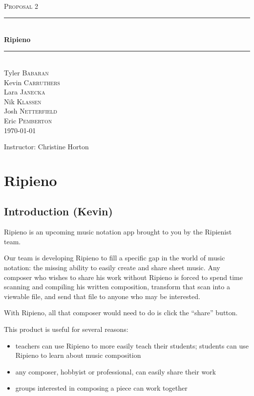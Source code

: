 \documentclass[12pt]{article}
\newcommand{\HRule}{\rule{\linewidth}{0.5mm}}
\begin{document}
\newpage

\begin{titlepage}
\begin{center}
\textsc{\LARGE }\\[1.5cm]
\textsc{\Large Proposal 2}\\[0.5cm]

\HRule \\[0.4cm]
{\huge \bfseries Ripieno}\\
\HRule \\[1.5cm]

Tyler \textsc{Babaran}\\
Kevin \textsc{Carruthers}\\
Lara \textsc{Janecka}\\
Nik \textsc{Klassen}\\
Josh \textsc{Netterfield}\\
Eric \textsc{Pemberton}\\

\vfill
{\large \today}
\end{center}

Instructor: Christine Horton
\end{titlepage}

\tableofcontents
\newpage

\section{Ripieno}
\subsection{Introduction (Kevin)}
Ripieno is an upcoming music notation app brought to you by the Ripienist team.

Our team is developing Ripieno to fill a specific gap in the world of music notation: the missing ability to easily create and share sheet music. Any composer who wishes to share his work without Ripieno is forced to spend time scanning and compiling his written composition, transform that scan into a viewable file, and send that file to anyone who may be interested.

With Ripieno, all that composer would need to do is click the ``share'' button.

This product is useful for several reasons:
\begin{itemize}
\item teachers can use Ripieno to more easily teach their students; students can use Ripieno to learn about music composition
\item any composer, hobbyist or professional, can easily share their work
\item groups interested in composing a piece can work together
\end{itemize}
\end{document}
